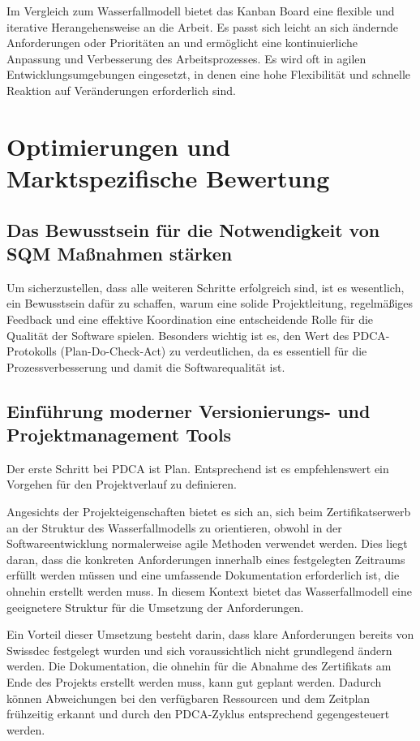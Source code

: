 Im Vergleich zum Wasserfallmodell bietet das Kanban Board eine flexible und iterative Herangehensweise an die Arbeit. Es passt sich leicht an sich ändernde Anforderungen oder Prioritäten an und ermöglicht eine kontinuierliche Anpassung und Verbesserung des Arbeitsprozesses. Es wird oft in agilen Entwicklungsumgebungen eingesetzt, in denen eine hohe Flexibilität und schnelle Reaktion auf Veränderungen erforderlich sind.

\section{Optimierungen und Marktspezifische Bewertung}

\subsection{Das Bewusstsein für die Notwendigkeit von SQM Maßnahmen stärken}

Um sicherzustellen, dass alle weiteren Schritte erfolgreich sind, ist es wesentlich, ein Bewusstsein dafür zu schaffen, warum eine solide Projektleitung, regelmäßiges Feedback und eine effektive Koordination eine entscheidende Rolle für die Qualität der Software spielen. Besonders wichtig ist es, den Wert des PDCA-Protokolls (Plan-Do-Check-Act) zu verdeutlichen, da es essentiell für die Prozessverbesserung und damit die Softwarequalität ist.

\subsection{Einführung moderner Versionierungs- und Projektmanagement Tools}

Der erste Schritt bei PDCA ist Plan. Entsprechend ist es empfehlenswert ein Vorgehen für den Projektverlauf zu definieren.

Angesichts der Projekteigenschaften bietet es sich an, sich beim Zertifikatserwerb an der Struktur des Wasserfallmodells zu orientieren, obwohl in der Softwareentwicklung normalerweise agile Methoden verwendet werden.
Dies liegt daran, dass die konkreten Anforderungen innerhalb eines festgelegten Zeitraums erfüllt werden müssen und eine umfassende Dokumentation erforderlich ist, die ohnehin erstellt werden muss.
In diesem Kontext bietet das Wasserfallmodell eine geeignetere Struktur für die Umsetzung der Anforderungen.

Ein Vorteil dieser Umsetzung besteht darin, dass klare Anforderungen bereits von Swissdec festgelegt wurden und sich voraussichtlich nicht grundlegend ändern werden. Die Dokumentation, die ohnehin für die Abnahme des Zertifikats am Ende des Projekts erstellt werden muss, kann gut geplant werden. Dadurch können Abweichungen bei den verfügbaren Ressourcen und dem Zeitplan frühzeitig erkannt und durch den PDCA-Zyklus entsprechend gegengesteuert werden.

